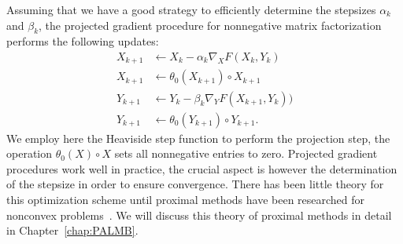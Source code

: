 Assuming that we have a good strategy to efficiently determine the stepsizes $\alpha_k$ and $\beta_k$, the projected gradient procedure for nonnegative matrix factorization performs the following updates:
\begin{align*}
X_{k+1}&\gets X_k-\alpha_k\nabla_XF(X_k,Y_k) \\
X_{k+1}&\gets \theta_0(X_{k+1})\circ X_{k+1}\\
Y_{k+1}&\gets Y_k-\beta_k\nabla_YF(X_{k+1},Y_k))\\
Y_{k+1}&\gets \theta_0(Y_{k+1})\circ Y_{k+1}.
\end{align*}
We employ here the Heaviside step function to perform the projection step, the operation $\theta_0(X)\circ X$ sets all nonnegative entries to zero. Projected gradient procedures work well in practice, the crucial aspect is however the determination of the stepsize in order to ensure convergence. There has been little theory for this optimization scheme until proximal methods have been researched for nonconvex problems~\cite{bolte2014proximal}. We will discuss this theory of proximal methods in detail in Chapter~\ref{chap:PALMB}.


